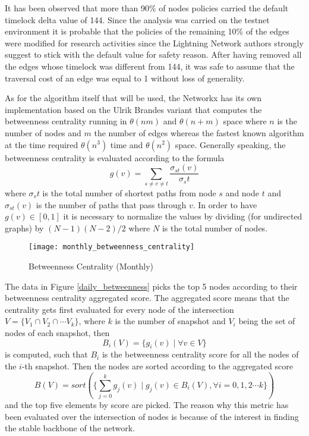 	It has been observed that more than 90\% of nodes policies carried the default timelock delta value of 144. Since the analysis was carried on the testnet environment it is probable that the policies of the remaining 10\% of the edges were modified for research activities since the Lightning Network authors strongly suggest to stick with the default value for safety reason. After having removed all the edges whose timelock was different from 144, it was safe to assume that the traversal cost of an edge was equal to 1 without loss of generality.
	
	
	As for the algorithm itself that will be used, the Networkx has its own implementation based on the Ulrik Brandes \cite{Brandes2001} variant that computes the betweenness centrality running in $\theta(nm)$ and $\theta(n + m)$ space where $n$ is the number of nodes and $m$ the number of edges whereas the fastest known algorithm at the time required $\theta(n^3)$ time and $\theta(n^2)$ space.	Generally speaking, the betweenness centrality is evaluated according to the formula 
	\begin{equation}
		g(v) = \sum_{s \neq v \neq t}{\frac{\sigma_{st}(v) }{\sigma_st}}
	\end{equation}
	where $\sigma_st$ is the total number of shortest paths from node $s$ and node $t$ and $\sigma_{st}(v)$ is the number of paths that pass through $v$. In order to have $g(v) \in [0, 1]$ it is necessary to normalize the values by dividing (for undirected graphs) by $(N-1)(N-2)/2$ where $N$ is the total number of nodes.
	
	\begin{figure}
		\centering
		\texttt{[image: monthly\_betweenness\_centrality]}
		\caption{Betweenness Centrality (Monthly)}
		\label{monthly_betweenness_centrality}
	\end{figure}		
	
	The data in Figure \ref{daily_betweenness} picks the top 5 nodes according to their betweenness centrality aggregated score. The aggregated score means that the centrality gets first evaluated for every node of the intersection $V = \{V_1 \cap V_2 \cap \cdots V_k \}$, where $k$ is the number of snapshot and $V_i$ being the set of nodes of each snapshot, then
	\begin{equation}
		B_i(V) = \{ g_i(v) \mid \forall v \in V \}
	\end{equation}
	is computed, such that $B_i$ is the betweenness centrality score for all the nodes of the $i$-th snapshot. Then the nodes are sorted according to the aggregated score
	\begin{equation}
		B(V) = sort(\{ \sum_{j = 0}^{k}g_j(v) \mid g_j(v) \in B_i(V), \forall i= 0,1,2 \cdots k\})
	\end{equation}
	and the top five elements by score are picked. The reason why this metric has been evaluated over the intersection of nodes is because of the interest in finding the stable backbone of the network.
	
